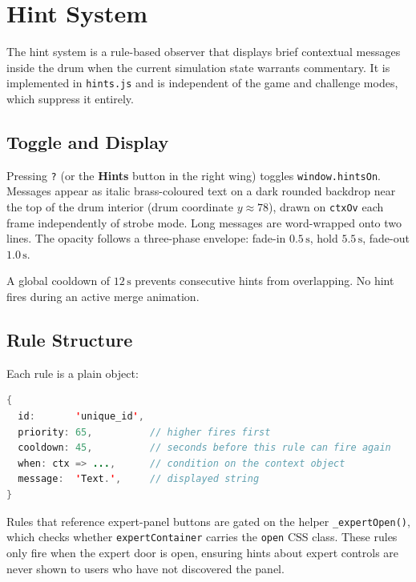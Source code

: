 \documentclass[12pt, a4paper]{article}
\begin{document}
\section{Hint System}
\label{sec:hints}

The hint system is a rule-based observer that displays brief contextual
messages inside the drum when the current simulation state warrants commentary.
It is implemented in \texttt{hints.js} and is independent of the game and
challenge modes, which suppress it entirely.

\subsection{Toggle and Display}

Pressing \texttt{?} (or the \textbf{Hints} button in the right wing) toggles
\texttt{window.hintsOn}. Messages appear as italic brass-coloured text on a
dark rounded backdrop near the top of the drum interior
(drum coordinate $y \approx 78$), drawn on \texttt{ctxOv} each frame
independently of strobe mode. Long messages are word-wrapped onto two lines.
The opacity follows a three-phase envelope:
fade-in $0.5\,\mathrm{s}$, hold $5.5\,\mathrm{s}$, fade-out $1.0\,\mathrm{s}$.

A global cooldown of $12\,\mathrm{s}$ prevents consecutive hints from
overlapping. No hint fires during an active merge animation.

\subsection{Rule Structure}

Each rule is a plain object:
\begin{lstlisting}[language=Java]
{
  id:       'unique_id',
  priority: 65,          // higher fires first
  cooldown: 45,          // seconds before this rule can fire again
  when: ctx => ...,      // condition on the context object
  message:  'Text.',     // displayed string
}
\end{lstlisting}

Rules that reference expert-panel buttons are gated on the helper
\texttt{\_expertOpen()}, which checks whether \texttt{expertContainer} carries
the \texttt{open} CSS class. These rules only fire when the expert door is
open, ensuring hints about expert controls are never shown to users who have
not discovered the panel.
\end{document}
